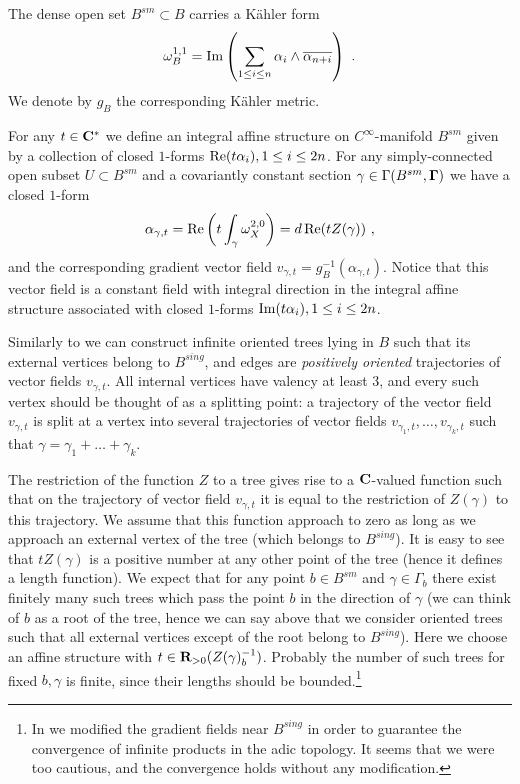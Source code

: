 \documentclass[12pt]{article}
\begin{document}
The dense open set $B^{sm}\subset B$ carries a K\"ahler form 
$$\omega_{B}^{1,1}=\operatorname{Im}\left(\sum_{1\le i\le n}\alpha_i\wedge\overline{\alpha_{n+i}}\right)\,\,.$$ We denote by $g_{B}$ the corresponding K\"ahler metric.

For any $t\in {\bf C}^{\ast}$ we define an integral affine structure on $C^{\infty}$-manifold $B^{sm}$ given by a collection of closed $1$-forms $\operatorname{Re}(t\alpha_i), 1\le i\le 2n$. For any simply-connected open subset $U\subset B^{sm}$ and a covariantly constant section $\gamma\in \Gamma(B^{sm},{\bf \Gamma})$ we have a closed $1$-form
$$\alpha_{\gamma,t}=\operatorname{Re}\left(t\int_{\gamma}\omega_X^{2,0}\right)=d\operatorname{Re}(tZ(\gamma))\,\,,$$
and the corresponding gradient vector field $v_{\gamma,t}=g_B^{-1}(\alpha_{\gamma,t})$.
 Notice that this vector field is a constant field with integral direction in the integral affine structure associated with closed $1$-forms $\operatorname{Im}(t\alpha_i), 1\le i\le 2n$.

Similarly to \cite{KoSo1} we can construct  infinite oriented trees lying in $B$ such that its external vertices belong to $B^{sing}$, and edges are {\it positively oriented } trajectories of vector fields $v_{\gamma,t}$. All internal vertices have valency at least $3$, and  every such vertex should be thought of as a splitting point: a trajectory of the vector field $v_{\gamma,t}$ is split at a vertex into several trajectories of vector fields $v_{\gamma_1,t},\dots,v_{\gamma_k,t}$ such that $\gamma=\gamma_1+\dots+\gamma_k$.

The restriction of the function $Z$ to a tree gives rise to a ${\bf C}$-valued function such that on the trajectory of vector field $v_{\gamma,t}$ it is equal to the restriction of $Z(\gamma)$ to this trajectory. We assume that this function approach to zero as long as we approach an external vertex of the tree (which belongs to $B^{sing}$).
It is easy to see that  $tZ(\gamma)$ is a positive number at any other point of the tree (hence it defines a length function).
We expect that for any point $b\in B^{sm}$ and $\gamma\in \Gamma_b$ there exist finitely many such trees which pass the point $b$ in the direction of $\gamma$ (we can think of $b$ as a root of the tree, hence we can say above that we consider oriented trees such that all external vertices except of the root belong to $B^{sing}$). Here we choose an affine structure with $t\in {\bf R}_{>0}(Z(\gamma)_b^{-1})$.
Probably the number of such trees for fixed $b,\gamma$ is finite, since their lengths
should be bounded.\footnote{In \cite{KoSo1} we modified the gradient fields near $B^{sing}$ in order to guarantee the convergence of infinite products in the adic topology. It seems that we were too cautious, and the convergence holds without any modification.}
\end{document}
